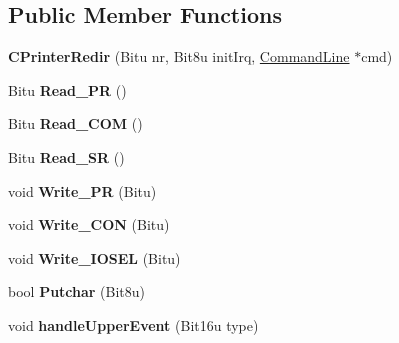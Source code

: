 \subsection*{Public Member Functions}
\begin{DoxyCompactItemize}
\item 
\hypertarget{classCPrinterRedir_ae9f806803fed7f32e35f95c838df5b56}{{\bfseries C\-Printer\-Redir} (Bitu nr, Bit8u init\-Irq, \hyperlink{classCommandLine}{Command\-Line} $\ast$cmd)}\label{classCPrinterRedir_ae9f806803fed7f32e35f95c838df5b56}

\item 
\hypertarget{classCPrinterRedir_a8a06bd07b0804ecdd0a1ab9da65459ea}{Bitu {\bfseries Read\-\_\-\-P\-R} ()}\label{classCPrinterRedir_a8a06bd07b0804ecdd0a1ab9da65459ea}

\item 
\hypertarget{classCPrinterRedir_a9b1455d1abffaf080bf4fd7c5078bf60}{Bitu {\bfseries Read\-\_\-\-C\-O\-M} ()}\label{classCPrinterRedir_a9b1455d1abffaf080bf4fd7c5078bf60}

\item 
\hypertarget{classCPrinterRedir_a5f7657440c808f56c96a0d3c8e8817cb}{Bitu {\bfseries Read\-\_\-\-S\-R} ()}\label{classCPrinterRedir_a5f7657440c808f56c96a0d3c8e8817cb}

\item 
\hypertarget{classCPrinterRedir_a4ca7900eada00de28639b832036ce295}{void {\bfseries Write\-\_\-\-P\-R} (Bitu)}\label{classCPrinterRedir_a4ca7900eada00de28639b832036ce295}

\item 
\hypertarget{classCPrinterRedir_a41ecc3906ab757642a506ac58020d163}{void {\bfseries Write\-\_\-\-C\-O\-N} (Bitu)}\label{classCPrinterRedir_a41ecc3906ab757642a506ac58020d163}

\item 
\hypertarget{classCPrinterRedir_a0aa428b7129540dd917bf61956e45024}{void {\bfseries Write\-\_\-\-I\-O\-S\-E\-L} (Bitu)}\label{classCPrinterRedir_a0aa428b7129540dd917bf61956e45024}

\item 
\hypertarget{classCPrinterRedir_aaf22e4458121305989ec4b4ea5208e63}{bool {\bfseries Putchar} (Bit8u)}\label{classCPrinterRedir_aaf22e4458121305989ec4b4ea5208e63}

\item 
\hypertarget{classCPrinterRedir_aea185c1c00dffb1f96896ff5a1f93ef8}{void {\bfseries handle\-Upper\-Event} (Bit16u type)}\label{classCPrinterRedir_aea185c1c00dffb1f96896ff5a1f93ef8}

\end{DoxyCompactItemize}
